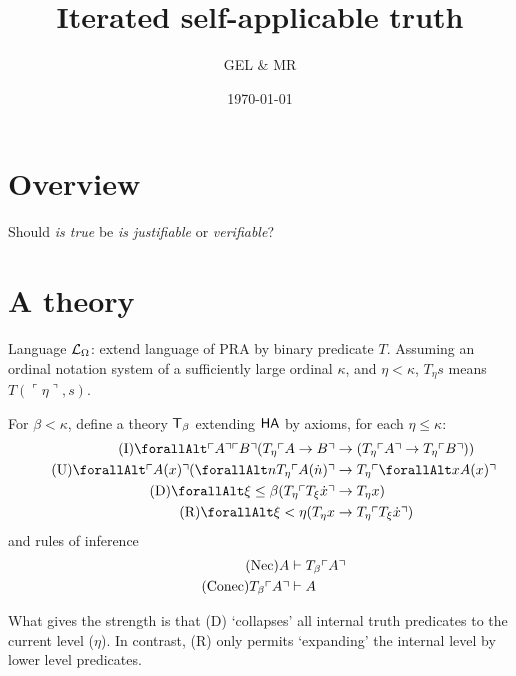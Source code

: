 \documentclass[UKenglish,cleveref,DIV=12]{scrartcl}
\title{Iterated self-applicable truth}
\author{GEL \& MR}
\date{\today}
\let\forall\forallAlt
\theoremstyle{definition}
\theoremstyle{definition}
\begin{document}
\maketitle

\tableofcontents



\section{Overview}
Should \emph{is true} be \emph{is justifiable} or \emph{verifiable}?

\section{A theory}

Language \( \mathcal{L}_\Omega \): extend language of PRA by binary predicate \( T \).
Assuming an ordinal notation system of a sufficiently large ordinal \( \kappa \), and \( \eta < \kappa \), \( T_\eta s \) means \( T( \ulcorner \eta \urcorner , s ) \).

For \( \beta < \kappa \), define a theory \( \mathsf{T}_\beta \) extending \( \mathsf{HA} \) by axioms, for each \( \eta \le \kappa \):
\begin{align*}
\tag{I}
	\forall \gn A \gn B ( T_\eta \gn { A \rightarrow B} &\rightarrow ( T_\eta \gn A \rightarrow T_\eta \gn B ) )
	\\
\tag{U}
	\forall \gn{A(x)}( \forall n T_\eta  \gn{ A(\dot n)} &\rightarrow T_\eta \gn{ \forall x A(x) }
	\\
\tag{D}
	\forall \xi \le \beta ( T_\eta \gn{ T_\xi \dot x } &\rightarrow T_\eta x )
	\\
\tag{R}
	\forall \xi < \eta ( T_\eta x &\rightarrow T_\eta \gn{ T_\xi \dot x })
\end{align*}
%
and rules of inference
\begin{align*}
	\tag{Nec}
	A &\vdash T_\beta \ulcorner{A}\urcorner
	\\
	\tag{Conec}
	T_\beta \ulcorner{A}\urcorner &\vdash A
\end{align*}

What gives the strength is that (D) `collapses' all internal truth predicates to the current level (\( \eta \)).
In contrast, (R) only permits `expanding' the internal level by lower level predicates.
\end{document}

